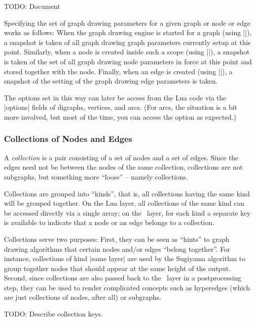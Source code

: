 TODO: Document

Specifying the set of graph drawing parameters for a given graph or
node or edge works as follows: When the graph drawing engine is
started for a graph (using |\pgfgdbeginscope|), a snapshot is taken of
all graph drawing graph parameters currently setup at this
point. Similarly, when a node is created inside such a scope (using
|\pgfnode|), a snapshot is taken of the set of all graph drawing node
parameters in force at this point and stored together with
the node. Finally, when an edge is created (using |\pgfgdedge|), a
snapshot of the setting of the graph drawing edge parameters is
taken. 

The options set in this way can later be access from the Lua code via
the |options| fields of digraphs, vertices, and arcs. (For arcs, the
situation is a bit more involved, but most of the time, you can access
the option as expected.)



\subsubsection{Collections of Nodes and Edges}

\label{section-gd-collections}

A \emph{collection} is a pair consisting of a set of nodes and a set of
edges. Since the edges need not be between the nodes of the same
collection, collections are not subgraphs, but something more
``loose'' -- namely collections.

Collections are grouped into ``kinds'', that is, all collections
having the same kind will be grouped together. On the Lua layer, all
collections of the same kind can be accessed directly via a single
array; on the \pgfname\ layer, for each kind a separate key is available
to indicate that a node or an edge belongs to a collection. 

Collections serve two purposes: First, they can be seen as ``hints''
to graph drawing algorithms that certain nodes and/or edges ``belong
together''. For instance, collections of kind |same layer| are used
by the Sugiyama algorithm to group together nodes that should appear
at the same height of the output. Second, since collections are also
passed back to the \pgfname\ layer in a postprocessing step, they can be
used to render complicated concepts such as hyperedges (which are
just collections of nodes, after all) or subgraphs.

TODO: Describe collection keys.

